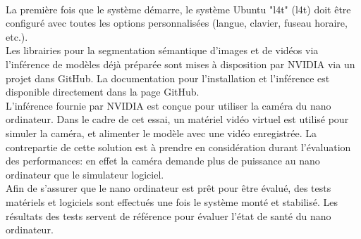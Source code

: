 \vspace{\baselineskip}
\\
\noindent La première fois que le système démarre, le système Ubuntu "\acrlong{l4t}" (\acrshort{l4t}) doit être configuré avec toutes les options personnalisées (langue, clavier, fuseau horaire, etc.).
\vspace{\baselineskip}
\\
\noindent Les librairies pour la segmentation sémantique 
d'images et de vidéos via l'inférence de modèles déjà préparée sont mises à disposition par NVIDIA via un projet dans GitHub. La documentation pour l'installation et l'inférence est disponible directement dans la page GitHub. 
\vspace{\baselineskip}
\\
\noindent L'inférence fournie par NVIDIA est conçue pour utiliser la caméra du nano ordinateur. Dans le cadre de cet essai, un matériel vidéo virtuel est utilisé pour simuler la caméra, et alimenter le modèle avec une vidéo enregistrée. La contrepartie de cette solution est à prendre en considération durant l'évaluation des performances: en effet la caméra demande plus de puissance au nano ordinateur que le simulateur logiciel.
\vspace{\baselineskip}
\\
\noindent Afin de s'assurer que le nano ordinateur est prêt pour être évalué, des tests matériels et logiciels sont effectués une fois le système monté et stabilisé. Les résultats des tests servent de référence pour évaluer l'état de santé du nano ordinateur. 